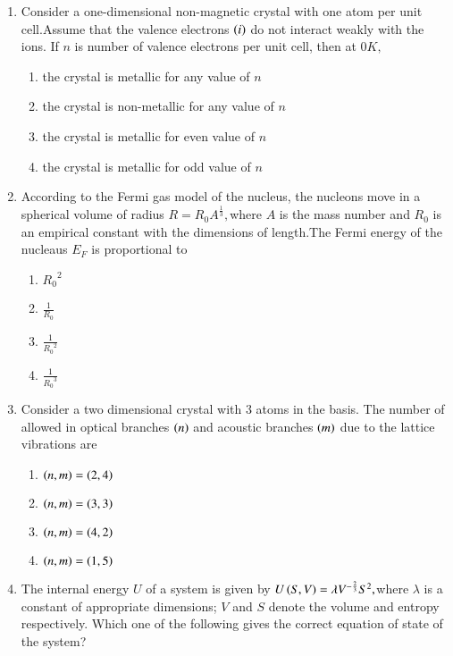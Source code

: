 \documentclass[journal]{IEEEtran}
\begin{document}
\begin{enumerate}
\begin{enumerate}
\begin{tikzpicture}
    
\end{tikzpicture}

\end{enumerate}
    \item Consider a one-dimensional non-magnetic crystal with one atom per unit cell.Assume that the valence electrons $\brak{i}$ do not interact weakly with the ions. If $n$ is number of valence electrons per unit cell, then at $0K,$
    \begin{enumerate}
        \item the crystal is metallic for any value of $n$
        \item the crystal is non-metallic for any value of $n$
        \item the crystal is metallic for even value of $n$
        \item the crystal is metallic for odd value of $n$
    \end{enumerate}
    \item According to the Fermi gas model of the nucleus, the nucleons move in a spherical volume of radius $R=R_0A^{\frac{1}{3}},$where $A$ is the mass number and $R_0$ is an empirical constant with the dimensions of length.The Fermi energy of the nucleaus $E_F$ is proportional to
    \begin{enumerate}
        \item ${R_0}^2$
        \item $\frac{1}{R_0}$
        \item $\frac{1}{{R_0}^2}$
        \item $\frac{1}{{R_0}^3}$
    \end{enumerate}
    \item Consider a two dimensional crystal with $3$ atoms in the basis. The number of allowed in optical branches $\brak{n}$ and acoustic branches $\brak{m}$ due to the lattice vibrations are
    \begin{enumerate}
        \item $\brak{n,m}=\brak{2,4}$
        \item $\brak{n,m}=\brak{3,3}$
        \item $\brak{n,m}=\brak{4,2}$
        \item $\brak{n,m}=\brak{1,5}$
    \end{enumerate}
    \item The internal energy $U$ of a system is given by $U\brak{S,V}=\lambda V^{-\frac{2}{3}}S^2,$where $\lambda$ is a constant of appropriate dimensions; $V$ and $S$ denote the volume and entropy respectively. Which one of the following gives the correct equation of state of the system?

\end{enumerate}
\end{document}
